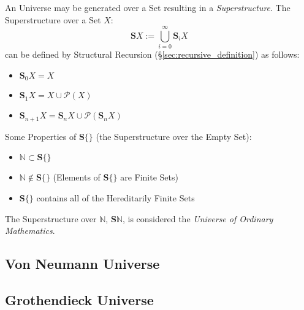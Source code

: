 An Universe may be generated over a Set resulting in a
\emph{Superstructure}. The Superstructure over a Set $X$:
\[
    \mathbf{S}X := \bigcup^{\infty}_{i=0}\mathbf{S}_i X
\]
can be defined by Structural Recursion
(\S\ref{sec:recursive_definition}) as follows:
\begin{itemize}

\item $\mathbf{S}_0 X = X$
\item $\mathbf{S}_1 X = X \cup \mathcal{P}(X)$
\item $\mathbf{S}_{n+1} X =
    \mathbf{S}_n X \cup \mathcal{P}(\mathbf{S}_n X)$

\end{itemize}
Some Properties of $\mathbf{S}\{\}$ (the Superstructure over the Empty
Set):
\begin{itemize}

\item $\mathbb{N} \subset \mathbf{S}\{\}$
\item $\mathbb{N} \notin \mathbf{S}\{\}$ (Elements of $\mathbf{S}\{\}$
  are Finite Sets)
\item $\mathbf{S}\{\}$ contains all of the Hereditarily Finite Sets

\end{itemize}

The Superstructure over $\mathbb{N}$, $\mathbf{S}\mathbb{N}$, is
considered the \emph{Universe of Ordinary Mathematics}.



\subsection{Von Neumann Universe}\label{sec:vonneumann_universe}

\subsection{Grothendieck Universe}\label{sec:grothendieck_universe}




